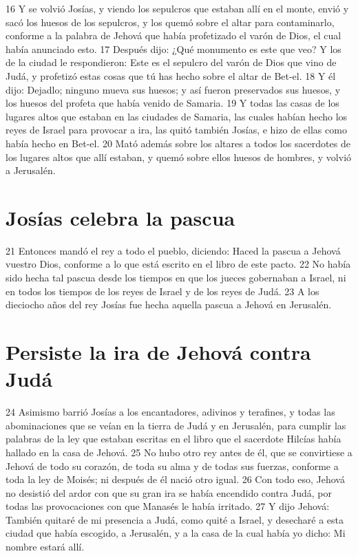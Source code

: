 16 Y se volvió Josías, y viendo los sepulcros que estaban allí en el monte, envió y sacó los huesos de los sepulcros, y los quemó sobre el altar para contaminarlo, conforme a la palabra de Jehová que había profetizado el varón de Dios, el cual había anunciado esto. 
17 Después dijo: ¿Qué monumento es este que veo? Y los de la ciudad le respondieron: Este es el sepulcro del varón de Dios que vino de Judá, y profetizó estas cosas que tú has hecho sobre el altar de Bet-el. 
18 Y él dijo: Dejadlo; ninguno mueva sus huesos; y así fueron preservados sus huesos, y los huesos del profeta que había venido de Samaria.
19 Y todas las casas de los lugares altos que estaban en las ciudades de Samaria, las cuales habían hecho los reyes de Israel para provocar a ira, las quitó también Josías, e hizo de ellas como había hecho en Bet-el.
20 Mató además sobre los altares a todos los sacerdotes de los lugares altos que allí estaban, y quemó sobre ellos huesos de hombres, y volvió a Jerusalén.
\section*{Josías celebra la pascua}

 
21 Entonces mandó el rey a todo el pueblo, diciendo: Haced la pascua a Jehová vuestro Dios, conforme a lo que está escrito en el libro de este pacto.
22 No había sido hecha tal pascua desde los tiempos en que los jueces gobernaban a Israel, ni en todos los tiempos de los reyes de Israel y de los reyes de Judá.
23 A los dieciocho años del rey Josías fue hecha aquella pascua a Jehová en Jerusalén.
\section*{Persiste la ira de Jehová contra Judá}

24 Asimismo barrió Josías a los encantadores, adivinos y terafines, y todas las abominaciones que se veían en la tierra de Judá y en Jerusalén, para cumplir las palabras de la ley que estaban escritas en el libro que el sacerdote Hilcías había hallado en la casa de Jehová.
25 No hubo otro rey antes de él, que se convirtiese a Jehová de todo su corazón, de toda su alma y de todas sus fuerzas, conforme a toda la ley de Moisés; ni después de él nació otro igual.
26 Con todo eso, Jehová no desistió del ardor con que su gran ira se había encendido contra Judá, por todas las provocaciones con que Manasés le había irritado.
27 Y dijo Jehová: También quitaré de mi presencia a Judá, como quité a Israel, y desecharé a esta ciudad que había escogido, a Jerusalén, y a la casa de la cual había yo dicho: Mi nombre estará allí.

